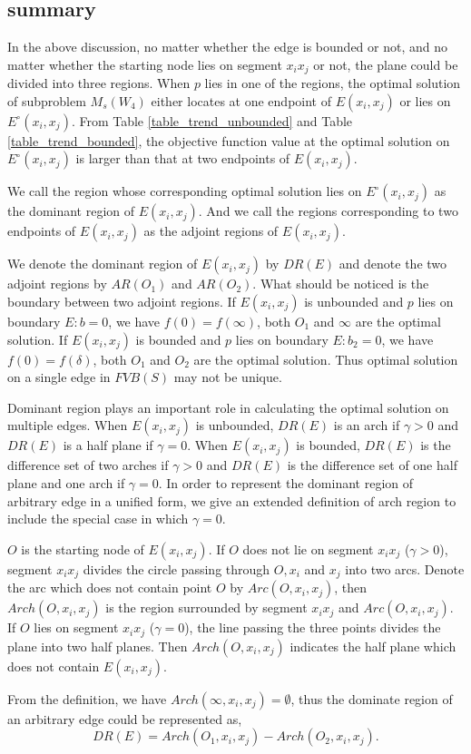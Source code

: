 \documentclass[final,3p,times]{elsarticle}
\begin{document}
\subsection{summary}
In the above discussion, no matter whether the edge is bounded or not, and no matter whether the starting node lies on segment $x_ix_j$ or not, the plane could be divided into three regions. When $p$ lies in one of the regions, the optimal solution of subproblem $M_s(W_4)$ either locates at one endpoint of $E(x_i,x_j)$ or lies on $E^\circ(x_i,x_j)$. %
From Table \ref{table_trend_unbounded} and Table \ref{table_trend_bounded}, the objective function value at the optimal solution on $E^\circ(x_i,x_j)$ is larger than that at two endpoints of $E(x_i,x_j)$.
\begin{defn}
We call the region whose corresponding optimal solution lies on $E^\circ(x_i,x_j)$ as the dominant region of $E(x_i,x_j)$. And we call the regions corresponding to two endpoints of $E(x_i,x_j)$ as the adjoint regions of $E(x_i,x_j)$.
\end{defn}
We denote the dominant region of $E(x_i,x_j)$ by $DR(E)$ and denote the two adjoint regions by $AR(O_1)$ and $AR(O_2)$. What should be noticed is the boundary between two adjoint regions. If $E(x_i,x_j)$ is unbounded and $p$ lies on boundary $E:b=0$, we have $f(0)=f(\infty)$, both $O_1$ and $\infty$ are the optimal solution. If $E(x_i,x_j)$ is bounded and $p$ lies on boundary $E:b_2=0$, we have $f(0)=f(\delta)$, both $O_1$ and $O_2$ are the optimal solution. Thus optimal solution on a single edge in $FVB(S)$ may not be unique.

Dominant region plays an important role in calculating the optimal solution on multiple edges. When $E(x_i,x_j)$ is unbounded, $DR(E)$ is an arch if $\gamma>0$ and $DR(E)$ is a half plane if $\gamma=0$. When $E(x_i,x_j)$ is bounded, $DR(E)$ is the difference set of two arches if $\gamma>0$ and $DR(E)$ is the difference set of one half plane and one arch if $\gamma=0$. In order to represent the dominant region of arbitrary edge in a unified form, we give an extended definition of arch region to include the special case in which $\gamma=0$.
\begin{defn}
\label{definition_arch}
$O$ is the starting node of $E(x_i,x_j)$. If $O$ does not lie on segment $x_ix_j$ ($\gamma>0$), segment $x_ix_j$ divides the circle passing through $O,x_i$ and $x_j$ into two arcs. Denote the arc which does not contain point $O$ by $Arc(O,x_i,x_j)$, then  $Arch(O,x_i,x_j)$ is the region surrounded by segment $x_ix_j$ and $Arc(O,x_i,x_j)$. If $O$ lies on segment $x_ix_j$ ($\gamma=0$), the line passing the three points divides the plane into two half planes. Then $Arch(O,x_i,x_j)$ indicates the half plane which does not contain $E(x_i,x_j)$.
\end{defn}
From the definition, we have $Arch(\infty,x_i,x_j)=\emptyset$, thus the dominate region of an arbitrary edge could be represented as,
\begin{equation}
DR(E) = Arch(O_1,x_i,x_j) - Arch(O_2,x_i,x_j).
\end{equation}
\end{document}

